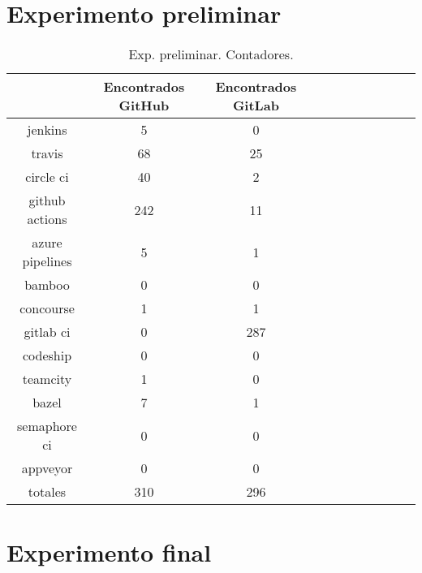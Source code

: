 \section{Experimento preliminar}

\begin{table}[h]
  \centering
  \caption{Exp. preliminar. Contadores.}
  \label{tab:tabla_p1}

\begin{footnotesize}
\renewcommand{\arraystretch}{1.5} %
\begin{tabular}{ccccccccccc}
  \hline
  {} &  Encontrados GitHub &  Encontrados GitLab \\
  \hline
  jenkins         &                   5 &                   0 \\
  travis          &                  68 &                  25 \\
  circle ci       &                  40 &                   2 \\
  github actions  &                 242 &                  11 \\
  azure pipelines &                   5 &                   1 \\
  bamboo          &                   0 &                   0 \\
  concourse       &                   1 &                   1 \\
  gitlab ci       &                   0 &                 287 \\
  codeship        &                   0 &                   0 \\
  teamcity        &                   1 &                   0 \\
  bazel           &                   7 &                   1 \\
  semaphore ci    &                   0 &                   0 \\
  appveyor        &                   0 &                   0 \\
  totales         &                 310 &                 296 \\
 \end{tabular}
\end{footnotesize}

\end{table}

\section{Experimento final}

